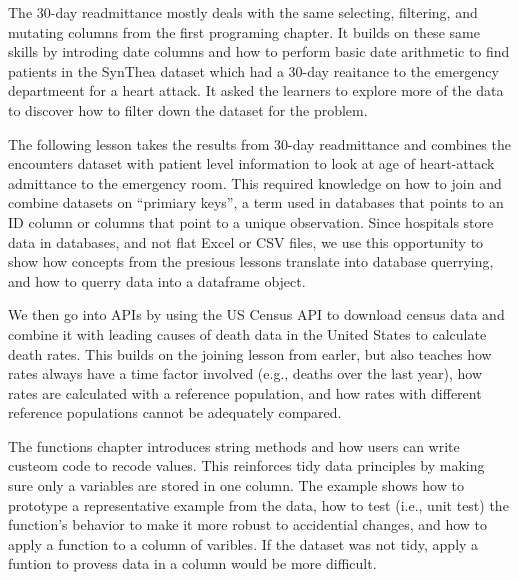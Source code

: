 \documentclass[020-persona_validation.tex]{subfiles}
\begin{document}
            The 30-day readmittance mostly deals with the same selecting, filtering, and mutating columns
            from the first programing chapter.
            It builds on these same skills by introding date columns and how to perform basic date arithmetic
            to find patients in the SynThea dataset which had a 30-day reaitance to the emergency departmeent for a heart attack.
            It asked the learners to explore more of the data to discover how to filter down the dataset for the problem.

            The following lesson takes the results from 30-day readmittance and combines the encounters dataset with
            patient level information to look at age of heart-attack admittance to the emergency room.
            This required knowledge on how to join and combine datasets on ``primiary keys'',
            a term used in databases that points to an ID column or columns that point to a unique observation.
            Since hospitals store data in databases, and not flat Excel or CSV files,
            we use this opportunity to show how concepts from the presious lessons translate into database querrying,
            and how to querry data into a dataframe object.

            We then go into APIs by using the US Census API to download census data and combine it with
            leading causes of death data in the United States to calculate death rates.
            This builds on the joining lesson from earler,
            but also teaches how rates always have a time factor involved (e.g., deaths over the last year),
            how rates are calculated with a reference population,
            and how rates with different reference populations cannot be adequately compared.

            The functions chapter introduces string methods and how users can write custeom code to
            recode values.
            This reinforces tidy data principles by making sure only a variables are stored in one column.
            The example shows how to prototype a representative example from the data,
            how to test (i.e., unit test) the function's behavior to make it more robust to accidential changes,
            and how to apply a function to a column of varibles.
            If the dataset was not tidy,
            apply a funtion to provess data in a column would be more difficult.
\end{document}
